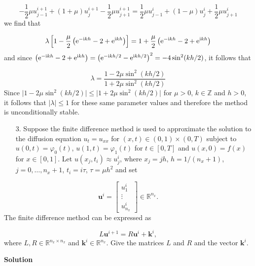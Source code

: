 \documentclass[12pt,a4paper]{article}
\begin{document}
\[
-\frac{1}{2}\mu u^{i+1}_{j-1} + (1 + \mu)u^{i+1}_j -\frac{1}{2}\mu u^{i+1}_{j+1} = 
\frac{1}{2}\mu u^{i}_{j-1} + (1 - \mu)u^{i}_j +\frac{1}{2}\mu u^{i}_{j+1} 
\]
we find that

\[
\lambda\left[1 - \frac{\mu}{2}\left({\rm e}^{-{\rm i}kh} - 2 +  {\rm e}^{{\rm i}kh} \right)    \right] = 1 + \frac{\mu}{2}\left({\rm e}^{-{\rm i}kh} - 2 +  {\rm e}^{{\rm i}kh} \right)  
\]
and since $\left({\rm e}^{-{\rm i}kh} - 2 +  {\rm e}^{{\rm i}kh} \right) = \left({\rm e}^{-{\rm i}kh/2} -  {\rm e}^{{\rm i}kh/2} \right)^2 = -4\sin^2(kh/2)$, it follows that

\[
\lambda = \frac{1 - 2\mu\sin^2(kh/2)}{1 + 2\mu\sin^2(kh/2)}
\]
Since $\vert 1 - 2\mu\sin^2(kh/2) \vert \leq \vert 1 + 2\mu\sin^2(kh/2)\vert$ for $\mu > 0$, $k \in \mathbb{Z}$ and $h > 0$, it follows that $\vert \lambda \vert \leq 1$ for these same parameter values and therefore the method is unconditionally stable.

\begin{itemize}
\item[3. ] Suppose the finite difference method is used to approximate the solution to the diffusion equation $u_t = u_{xx}$ for $(x, t) \in (0,1) \times (0,T)$ subject to $u(0,t) = \varphi_0(t)$, $u(1,t) = \varphi_1(t)$ for $t \in [0, T]$ and $u(x,0) = f(x)$ for $x \in [0, 1]$.  Let $u(x_j,t_i) \approx u^i_j$, where $x_j = jh$, $h = 1/(n_x + 1)$, $j = 0, \ldots, n_x+1$, $t_i = i\tau$, $\tau = \mu h^2$ and set

\end{itemize}
\[
\mathbf{u}^i = \begin{bmatrix}
u^{i}_{1} \\
\vdots \\
u^{i}_{n_x}
\end{bmatrix} \in \mathbb{R}^{n_x}.
\]
The finite difference method can be expressed as

\[
L\mathbf{u}^{i+1} = R\mathbf{u}^{i} + \mathbf{k}^{i},
\]
where $L, R \in \mathbb{R}^{n_x \times n_x}$ and $\mathbf{k}^{i} \in \mathbb{R}^{n_x}$.  Give the matrices $L$ and $R$ and the vector $\mathbf{k}^{i}$.

\textbf{Solution}
\end{document}

